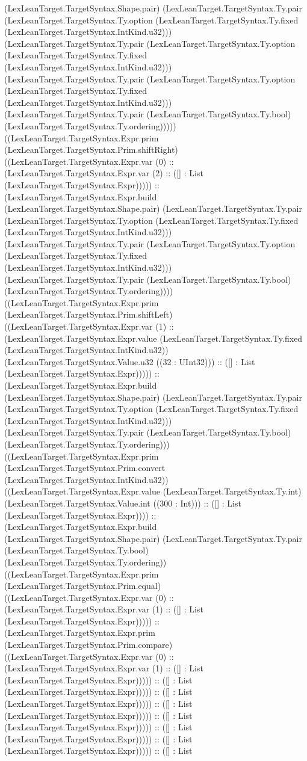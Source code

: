 \documentclass[11pt]{article}
\begin{document}
(LexLeanTarget.TargetSyntax.Shape.pair) (LexLeanTarget.TargetSyntax.Ty.pair (LexLeanTarget.TargetSyntax.Ty.option (LexLeanTarget.TargetSyntax.Ty.fixed (LexLeanTarget.TargetSyntax.IntKind.u32))) (LexLeanTarget.TargetSyntax.Ty.pair (LexLeanTarget.TargetSyntax.Ty.option (LexLeanTarget.TargetSyntax.Ty.fixed (LexLeanTarget.TargetSyntax.IntKind.u32))) (LexLeanTarget.TargetSyntax.Ty.pair (LexLeanTarget.TargetSyntax.Ty.option (LexLeanTarget.TargetSyntax.Ty.fixed (LexLeanTarget.TargetSyntax.IntKind.u32))) (LexLeanTarget.TargetSyntax.Ty.pair (LexLeanTarget.TargetSyntax.Ty.bool) (LexLeanTarget.TargetSyntax.Ty.ordering))))) ((LexLeanTarget.TargetSyntax.Expr.prim (LexLeanTarget.TargetSyntax.Prim.shiftRight) ((LexLeanTarget.TargetSyntax.Expr.var (0) :: (LexLeanTarget.TargetSyntax.Expr.var (2) :: ([] : List (LexLeanTarget.TargetSyntax.Expr))))) :: (LexLeanTarget.TargetSyntax.Expr.build (LexLeanTarget.TargetSyntax.Shape.pair) (LexLeanTarget.TargetSyntax.Ty.pair (LexLeanTarget.TargetSyntax.Ty.option (LexLeanTarget.TargetSyntax.Ty.fixed (LexLeanTarget.TargetSyntax.IntKind.u32))) (LexLeanTarget.TargetSyntax.Ty.pair (LexLeanTarget.TargetSyntax.Ty.option (LexLeanTarget.TargetSyntax.Ty.fixed (LexLeanTarget.TargetSyntax.IntKind.u32))) (LexLeanTarget.TargetSyntax.Ty.pair (LexLeanTarget.TargetSyntax.Ty.bool) (LexLeanTarget.TargetSyntax.Ty.ordering)))) ((LexLeanTarget.TargetSyntax.Expr.prim (LexLeanTarget.TargetSyntax.Prim.shiftLeft) ((LexLeanTarget.TargetSyntax.Expr.var (1) :: (LexLeanTarget.TargetSyntax.Expr.value (LexLeanTarget.TargetSyntax.Ty.fixed (LexLeanTarget.TargetSyntax.IntKind.u32)) (LexLeanTarget.TargetSyntax.Value.u32 ((32 : UInt32))) :: ([] : List (LexLeanTarget.TargetSyntax.Expr))))) :: (LexLeanTarget.TargetSyntax.Expr.build (LexLeanTarget.TargetSyntax.Shape.pair) (LexLeanTarget.TargetSyntax.Ty.pair (LexLeanTarget.TargetSyntax.Ty.option (LexLeanTarget.TargetSyntax.Ty.fixed (LexLeanTarget.TargetSyntax.IntKind.u32))) (LexLeanTarget.TargetSyntax.Ty.pair (LexLeanTarget.TargetSyntax.Ty.bool) (LexLeanTarget.TargetSyntax.Ty.ordering))) ((LexLeanTarget.TargetSyntax.Expr.prim (LexLeanTarget.TargetSyntax.Prim.convert (LexLeanTarget.TargetSyntax.IntKind.u32)) ((LexLeanTarget.TargetSyntax.Expr.value (LexLeanTarget.TargetSyntax.Ty.int) (LexLeanTarget.TargetSyntax.Value.int ((300 : Int))) :: ([] : List (LexLeanTarget.TargetSyntax.Expr)))) :: (LexLeanTarget.TargetSyntax.Expr.build (LexLeanTarget.TargetSyntax.Shape.pair) (LexLeanTarget.TargetSyntax.Ty.pair (LexLeanTarget.TargetSyntax.Ty.bool) (LexLeanTarget.TargetSyntax.Ty.ordering)) ((LexLeanTarget.TargetSyntax.Expr.prim (LexLeanTarget.TargetSyntax.Prim.equal) ((LexLeanTarget.TargetSyntax.Expr.var (0) :: (LexLeanTarget.TargetSyntax.Expr.var (1) :: ([] : List (LexLeanTarget.TargetSyntax.Expr))))) :: (LexLeanTarget.TargetSyntax.Expr.prim (LexLeanTarget.TargetSyntax.Prim.compare) ((LexLeanTarget.TargetSyntax.Expr.var (0) :: (LexLeanTarget.TargetSyntax.Expr.var (1) :: ([] : List (LexLeanTarget.TargetSyntax.Expr))))) :: ([] : List (LexLeanTarget.TargetSyntax.Expr))))) :: ([] : List (LexLeanTarget.TargetSyntax.Expr))))) :: ([] : List (LexLeanTarget.TargetSyntax.Expr))))) :: ([] : List (LexLeanTarget.TargetSyntax.Expr))))) :: ([] : List (LexLeanTarget.TargetSyntax.Expr))))) :: ([] : List (LexLeanTarget.TargetSyntax.Expr))))) :: ([] : List 
\end{document}
